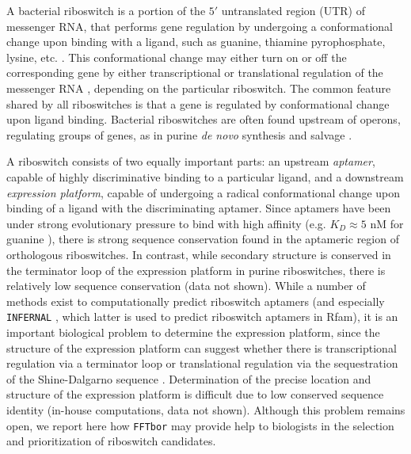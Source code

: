 A bacterial riboswitch is a portion of the $5'$
untranslated region (UTR) of messenger RNA,
that performs gene regulation by undergoing a conformational change upon
binding with a ligand, such as guanine, thiamine pyrophosphate, lysine,
etc.  \cite{breaker:Riboswitch2}.
This conformational change may either turn  on or off
the corresponding gene by either transcriptional or translational regulation
of the messenger RNA \cite{tuckerBreaker:review}, depending on the
particular riboswitch. The common feature shared by all riboswitches
is that a gene is regulated by conformational change upon ligand binding.
Bacterial riboswitches are often found upstream
of operons, regulating groups of genes, as in purine {\em de novo}
synthesis and salvage \cite{mandalBoeseBarrickWinklerBreaker}.

A riboswitch consists of two equally important parts: an upstream
{\em aptamer}, capable of highly discriminative binding to a particular
ligand, and a downstream {\em expression platform}, capable of undergoing
a radical conformational change upon binding of a ligand with the
discriminating aptamer.
Since aptamers have been under strong evolutionary pressure to
bind with high affinity
(e.g. $K_D \approx 5$ nM for guanine \cite{Mandal.nsmb04}),
there is strong
sequence conservation found in the aptameric region of orthologous
riboswitches.
In contrast, while secondary structure is conserved in the
terminator loop of the expression platform in purine riboswitches,
there is relatively low sequence conservation (data not shown).
While a number of methods exist to computationally predict
riboswitch aptamers
\cite{Bengert2004Riboswitch,Chang2009Computational,AbreuGoodger2005RibEx,Singh2009Riboswitch,Bergig.isb04}
(and especially {\tt INFERNAL} \cite{INFERNAL}, which latter is used
to predict riboswitch aptamers in Rfam), it is an important
biological problem to determine the expression platform, since the structure
of the expression platform can suggest whether there is
transcriptional regulation
via a terminator loop or translational regulation via the sequestration of
the Shine-Dalgarno sequence \cite{tuckerBreaker:review}. Determination of
the precise location and structure of the expression platform is difficult
due to low conserved sequence identity (in-house computations, data not shown).
Although this problem remains open, we report here how
{\tt FFTbor} may provide help to biologists in the selection and
prioritization of riboswitch candidates.

